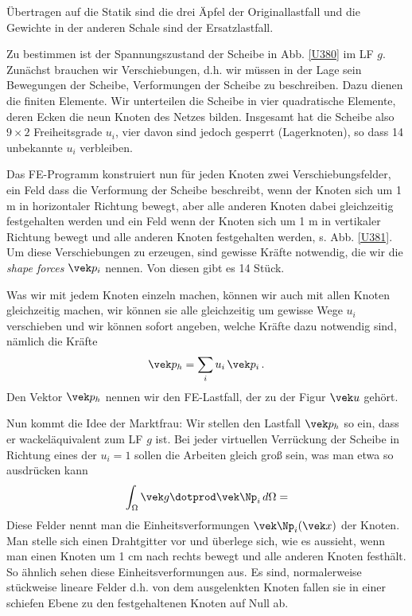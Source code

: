 \"{U}bertragen auf die Statik sind die drei \"{A}pfel der Originallastfall und die Gewichte in der anderen Schale sind der Ersatzlastfall.

Zu bestimmen ist der Spannungszustand der Scheibe in Abb. \ref{U380} im LF $g$. Zun\"{a}chst brauchen wir Verschiebungen, d.h. wir m\"{u}ssen in der Lage sein Bewegungen der Scheibe, Verformungen der Scheibe zu beschreiben. Dazu dienen die finiten Elemente. Wir unterteilen die Scheibe in vier quadratische Elemente, deren Ecken die neun Knoten des Netzes bilden. Insgesamt hat die Scheibe also $9 \times 2$ Freiheitsgrade $u_i$, vier davon sind jedoch gesperrt (Lagerknoten), so dass 14 unbekannte $u_i$ verbleiben.

Das FE-Programm konstruiert nun f\"{u}r jeden Knoten zwei Verschiebungsfelder, ein Feld dass die Verformung der Scheibe beschreibt, wenn der Knoten sich um 1 m in horizontaler Richtung bewegt, aber alle anderen Knoten dabei gleichzeitig festgehalten werden und ein Feld wenn der Knoten sich um 1 m in vertikaler Richtung bewegt und alle anderen Knoten festgehalten werden, s. Abb. \ref{U381}. Um diese Verschiebungen zu erzeugen, sind gewisse Kr\"{a}fte notwendig, die wir die {\em shape forces\/} $\vek p_i$ nennen. Von diesen gibt es 14 St\"{u}ck.

Was wir mit jedem Knoten einzeln machen, k\"{o}nnen wir auch mit allen Knoten gleichzeitig machen, wir k\"{o}nnen sie alle gleichzeitig um gewisse Wege $u_i$ verschieben und wir k\"{o}nnen sofort angeben, welche Kr\"{a}fte dazu notwendig sind, n\"{a}mlich die Kr\"{a}fte
\begin{align}
\vek p_h = \sum_i u_i\,\vek p_i\,.
\end{align}
Den Vektor $\vek p_h$ nennen wir den FE-Lastfall, der zu der Figur $\vek u$ geh\"{o}rt.

Nun kommt die Idee der Marktfrau: Wir stellen den Lastfall $\vek p_h$ so ein, dass er wackel\"{a}quivalent zum LF $g$ ist. Bei jeder virtuellen Verr\"{u}ckung der Scheibe in Richtung eines der $u_i = 1$ sollen die Arbeiten gleich gro{\ss} sein, was man etwa so ausdr\"{u}cken kann
\begin{align}
\int_{\Omega} \vek g \dotprod \vek \Np_i \,d\Omega =
\end{align}
Diese Felder nennt man die Einheitsverformungen $\vek \Np_i(\vek  x)$ der Knoten. Man stelle sich einen Drahtgitter vor und \"{u}berlege sich, wie es aussieht, wenn man einen Knoten um 1 cm nach rechts bewegt und alle anderen Knoten festh\"{a}lt. So \"{a}hnlich sehen diese Einheitsverformungen aus. Es sind, normalerweise st\"{u}ckweise lineare Felder d.h. von dem ausgelenkten Knoten fallen sie in einer schiefen Ebene zu den festgehaltenen Knoten auf Null ab.


